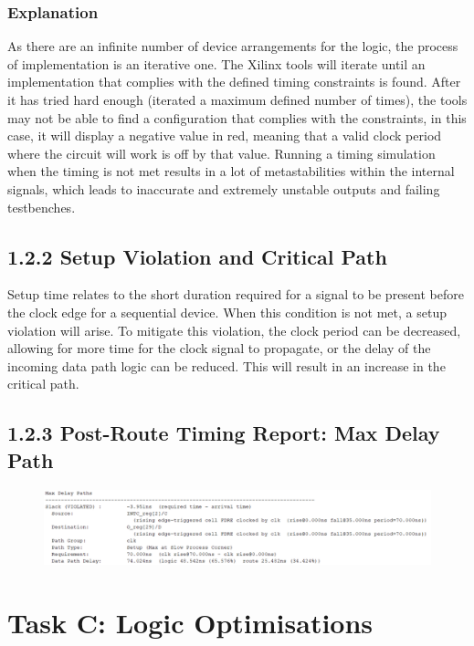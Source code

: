 \documentclass[11pt]{report}
\begin{document}
\subsection*{Explanation}
As there are an infinite number of device arrangements for the logic, the process of implementation is an iterative one. The Xilinx tools will iterate until an implementation that complies with the defined timing constraints is found. After it has tried hard enough (iterated a maximum defined number of times), the tools may not be able to find a configuration that complies with the constraints, in this case, it will display a negative value in red, meaning that a valid clock period where the circuit will work is off by that value. Running a timing simulation when the timing is not met results in a lot of metastabilities within the internal signals, which leads to inaccurate and extremely unstable outputs and failing testbenches.

\section*{1.2.2 Setup Violation and Critical Path}
Setup time relates to the short duration required for a signal to be present before the clock edge for a sequential device. When this condition is not met, a setup violation will arise. To mitigate this violation, the clock period can be decreased, allowing for more time for the clock signal to propagate, or the delay of the incoming data path logic can be reduced. This will result in an increase in the critical path.

\section*{1.2.3 Post-Route Timing Report: Max Delay Path}
\begin{figure}[H]
    \includegraphics[width=\columnwidth]{Reports/Lab2/Waveforms/1.2.3_max-path-delay.png}
\end{figure}


\chapter*{Task C: Logic Optimisations}
\end{document}
